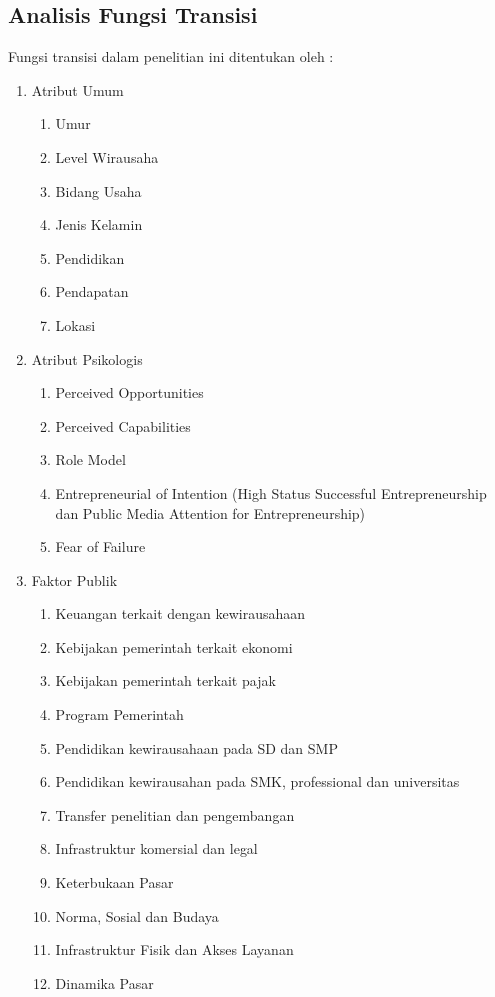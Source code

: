 \subsection{Analisis Fungsi Transisi}
Fungsi transisi dalam penelitian ini ditentukan oleh : 
\begin{enumerate}
	\item Atribut Umum
		\begin{enumerate}
			\item Umur
			\item Level Wirausaha
			\item Bidang Usaha
			\item Jenis Kelamin
			\item Pendidikan
			\item Pendapatan
			\item Lokasi
		\end{enumerate}
	\item Atribut Psikologis
		 \begin{enumerate}
			\item Perceived Opportunities
			\item Perceived Capabilities
			\item Role Model
			\item Entrepreneurial of Intention (High Status Successful Entrepreneurship dan Public Media Attention for Entrepreneurship)
			\item Fear of Failure
		 \end{enumerate}
	\item Faktor Publik
		 \begin{enumerate}
			\item Keuangan terkait dengan kewirausahaan
			\item Kebijakan pemerintah terkait ekonomi
			\item Kebijakan pemerintah terkait pajak
			\item Program Pemerintah
			\item Pendidikan kewirausahaan pada SD dan SMP
			\item Pendidikan kewirausahan pada SMK, professional dan universitas
			\item Transfer penelitian dan pengembangan
			\item Infrastruktur komersial dan legal
			\item Keterbukaan Pasar
			\item Norma, Sosial dan Budaya
			\item Infrastruktur Fisik dan Akses Layanan
			\item Dinamika Pasar
		 \end{enumerate}
\end{enumerate}


